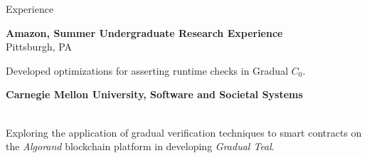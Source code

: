 
\begin{rSection}{Experience}


	{\textbf{\large{Amazon, Summer Undergraduate Research Experience}} \hfill \color{darkgray}{06/2023 - 08/2023} 
	\\ \vspace*{1mm}
	 \hfill{Pittsburgh, PA} 
	\\ 
	\color{black}
	\begin{minipage}{40em}
		\color{black}Developed optimizations for asserting runtime checks in Gradual $C_0$.
	\end{minipage}}
	
	\vspace*{2mm}

	{\textbf{\large{Carnegie Mellon University, Software and Societal Systems}} \hfill \color{darkgray}{06/2022 - Present} 
	\\ \vspace*{1mm}
	 \hfill \color{darkgray}{Pittsburgh, PA} 
	\\ 
	\color{black}
	\begin{minipage}{40em}
		\color{black}Exploring the application of gradual verification techniques to smart contracts on the \textit{Algorand} blockchain platform in developing \textit{Gradual Teal}.


\end{minipage}}
\end{rSection}
